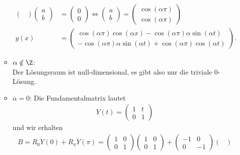 \begin{solution}
\begin{enumerate}[label = \textbf{\alph*)}]
\begin{itemize}
\begin{align*}
\begin{pmatrix}
        \end{pmatrix}
        \begin{pmatrix}
          a \\ b
        \end{pmatrix}
        &= \begin{pmatrix}
          0 \\ 0
        \end{pmatrix} \iff
        \begin{pmatrix}
          a \\ b
        \end{pmatrix}
        = \begin{pmatrix}
          \cos(\alpha \pi) \\ \cos(\alpha \pi)
        \end{pmatrix}\\
        y(x) &=
        \begin{pmatrix}
          \cos(\alpha \pi)\cos(\alpha x) - \cos(\alpha \pi)\alpha\sin(\alpha t) \\
          -\cos(\alpha \pi)\alpha\sin(\alpha t) + \cos(\alpha \pi)\cos(\alpha t)
        \end{pmatrix}.
      \end{align*}
    \item $\alpha \notin \Z$: \\
      Der Lösungsraum ist null-dimensional, es gibt also nur die triviale $0$-Lösung.
    \item $\alpha = 0$:
      Die Fundamentalmatrix lautet
      \begin{align*}
        Y(t) = \begin{pmatrix}
          1 & t \\ 0 & 1
        \end{pmatrix}
      \end{align*}
      und wir erhalten
      \begin{align*}
        B = R_0Y(0) + R_{\pi}Y(\pi) =
        \begin{pmatrix}
          1 & 0 \\ 0 & 1
        \end{pmatrix}
        \begin{pmatrix}
          1 & 0  \\ 0 & 1
        \end{pmatrix}
        + \begin{pmatrix}
          -1 & 0 \\ 0 & -1
        \end{pmatrix}
        \begin{pmatrix}

\end{pmatrix}
\end{align*}
\end{itemize}
\end{enumerate}
\end{solution}
